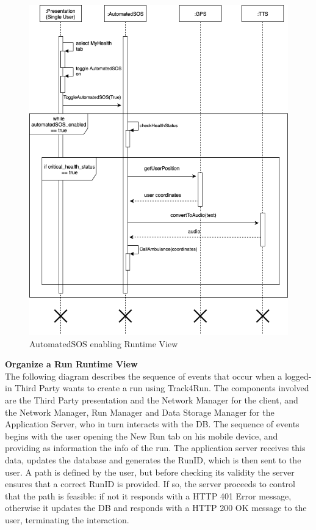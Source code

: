 \documentclass[titlepage]{article}
\begin{document}
\begin{figure}[H]
	\center
  	\includegraphics[width=13cm]{SOS.png}
  	\caption{AutomatedSOS enabling Runtime View}
 	\label{fig:SOS}
\end{figure}


{\bf Organize a Run Runtime View }\\ 
The following diagram describes the sequence of events that occur when a logged-in Third Party wants to create a run using Track4Run.
The components involved are the Third Party presentation and the Network Manager for the client, and the Network Manager, Run Manager and Data Storage Manager for the Application Server, who in turn interacts with the DB.
The sequence of events begins with the user opening the New Run tab on his mobile device, and providing as information the info of the run. The application server receives this data, updates the database and generates the RunID, which is then sent to the user. A path is defined by the user, but before checking its validity the server ensures that a correct RunID is provided. If so, the server proceeds to control that the path is feasible: if not it responds with a HTTP 401 Error message, otherwise it updates the DB and responds with a HTTP 200 OK message to the user, terminating the interaction.
\end{document}
